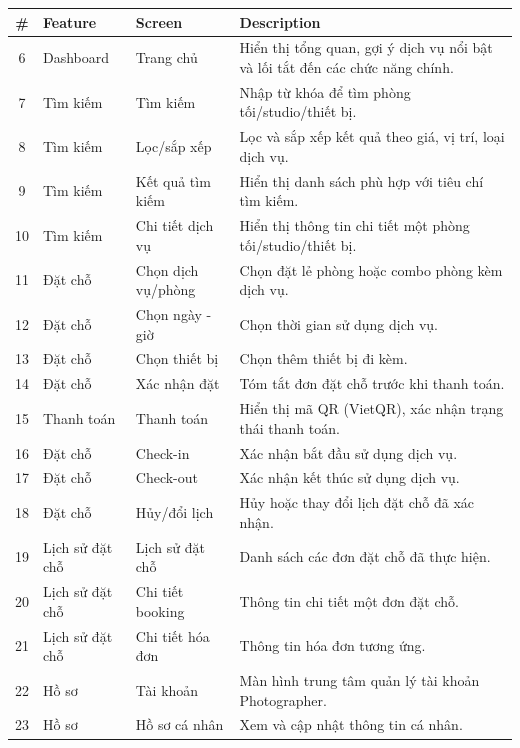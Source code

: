 \begin{table}[H]
	\centering
	\begin{tabular}{|c|p{3cm}|p{4cm}|p{6cm}|}
		\hline
		\textbf{\#} & \textbf{Feature} & \textbf{Screen} & \textbf{Description} \\
		\hline
		6 & Dashboard & Trang chủ &
		Hiển thị tổng quan, gợi ý dịch vụ nổi bật và lối tắt đến các chức năng chính. \\
		\hline
		7 & Tìm kiếm & Tìm kiếm &
		Nhập từ khóa để tìm phòng tối/studio/thiết bị. \\
		\hline
		8 & Tìm kiếm & Lọc/sắp xếp &
		Lọc và sắp xếp kết quả theo giá, vị trí, loại dịch vụ. \\
		\hline
		9 & Tìm kiếm & Kết quả tìm kiếm &
		Hiển thị danh sách phù hợp với tiêu chí tìm kiếm. \\
		\hline
		10 & Tìm kiếm & Chi tiết dịch vụ &
		Hiển thị thông tin chi tiết một phòng tối/studio/thiết bị. \\
		\hline
		11 & Đặt chỗ & Chọn dịch vụ/phòng &
		Chọn đặt lẻ phòng hoặc combo phòng kèm dịch vụ. \\
		\hline
		12 & Đặt chỗ & Chọn ngày - giờ &
		Chọn thời gian sử dụng dịch vụ. \\
		\hline
		13 & Đặt chỗ & Chọn thiết bị &
		Chọn thêm thiết bị đi kèm. \\
		\hline
		14 & Đặt chỗ & Xác nhận đặt &
		Tóm tắt đơn đặt chỗ trước khi thanh toán. \\
		\hline
		15 & Thanh toán & Thanh toán &
		Hiển thị mã QR (VietQR), xác nhận trạng thái thanh toán. \\
		\hline
		16 & Đặt chỗ & Check-in &
		Xác nhận bắt đầu sử dụng dịch vụ. \\
		\hline
		17 & Đặt chỗ & Check-out &
		Xác nhận kết thúc sử dụng dịch vụ. \\
		\hline
		18 & Đặt chỗ & Hủy/đổi lịch &
		Hủy hoặc thay đổi lịch đặt chỗ đã xác nhận. \\
		\hline
		19 & Lịch sử đặt chỗ & Lịch sử đặt chỗ &
		Danh sách các đơn đặt chỗ đã thực hiện. \\
		\hline
		20 & Lịch sử đặt chỗ & Chi tiết booking &
		Thông tin chi tiết một đơn đặt chỗ. \\
		\hline
		21 & Lịch sử đặt chỗ & Chi tiết hóa đơn &
		Thông tin hóa đơn tương ứng. \\
		\hline
		22 & Hồ sơ & Tài khoản &
		Màn hình trung tâm quản lý tài khoản Photographer. \\
		\hline
		23 & Hồ sơ & Hồ sơ cá nhân &
		Xem và cập nhật thông tin cá nhân. \\

\end{tabular}
\end{table}
